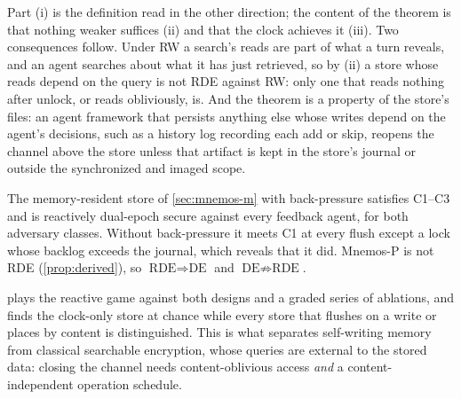 Part (i) is the definition read in the other direction; the content of the theorem is that nothing
weaker suffices (ii) and that the clock achieves it (iii). Two consequences follow. Under RW a
search's reads are part of what a turn reveals, and an agent searches about what it has just
retrieved, so by (ii) a store whose reads depend on the query is not RDE against RW: only one that
reads nothing after unlock, or reads obliviously, is. And the theorem is a property of the store's
files: an agent framework that persists anything else whose writes depend on the agent's decisions,
such as a history log recording each add or skip, reopens the channel above the store unless that
artifact is kept in the store's journal or outside the synchronized and imaged scope.

\begin{corollary}
\label{cor:m-reactive}
The memory-resident store of \cref{sec:mnemos-m} with back-pressure satisfies C1--C3 and is reactively
dual-epoch secure against every feedback agent, for both adversary classes. Without back-pressure it meets C1
at every flush except a lock whose backlog exceeds the journal, which reveals that it did. Mnemos-P
is not RDE (\cref{prop:derived}), so $\text{RDE} \Rightarrow \text{DE}$ and $\text{DE} \nRightarrow
\text{RDE}$.
\end{corollary}

 plays the reactive game against both designs and a graded series of
ablations, and finds the clock-only store at chance while every store that flushes on a write or
places by content is distinguished. This is what separates self-writing memory from classical
searchable encryption, whose queries are external to the stored data: closing the channel needs
content-oblivious access \emph{and} a content-independent operation schedule.

